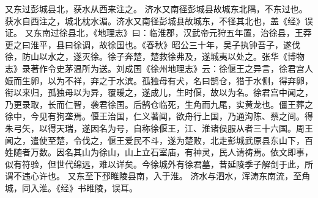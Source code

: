 \documentclass[12pt,UTF8]{ctexbook}
\begin{document}
又东过彭城县北，获水从西来注之。
济水又南径彭城县故城东北隅，不东过也。获水自西注之，城北枕水湄。济水又南径彭城县故城东，不径其北也，盖《经》误证。
又东南过徐县北，《地理志》曰：临淮郡，汉武帝元狩五年置，治徐县，王莽更之曰淮平，县曰徐调，故徐国也。《春秋》昭公三十年，吴子执钟吾子，遂伐徐，防山以水之，遂灭徐。徐子奔楚，楚救徐弗及，遂城夷以处之。张华《博物志》录著作令史茅温所为送。刘成国《徐州地理志》云：徐偃王之异言，徐君宫人娠而生卵，以为不祥，弃之于水滨。孤独母有犬，名曰鹄仓，猎于水侧，得弃卵，衔以来归，孤独母以为异，覆暖之，遂成儿，生时偃，故以为名。徐君宫中闻之，乃更录取，长而仁智，袭君徐国。后鹄仓临死，生角而九尾，实黄龙也。僵王葬之徐中，今见有狗垄焉。偃王治国，仁义著闻，欲舟行上国，乃通沟陈、蔡之间。得朱弓矢，以得天瑞，遂因名为号，自称徐偃王，江、淮诸侯服从者三十六国。周王闻之，遣使至楚，令伐之，偃王爱民不斗，遂为楚败，北走彭城武原县东山下，百姓随者万数。因名其山为徐山，山上立石室庙，有神灵，民人请祷焉。依文即事，似有符验，但世代绵远，难以详矣。今徐城外有徐君墓，昔延陵季子解剑于此，所谓不违心许也。
又东至下邳睢陵县南，入于淮。
济水与泗水，浑涛东南流，至角城，同入淮。《经》书睢陵，误耳。
\end{document}
